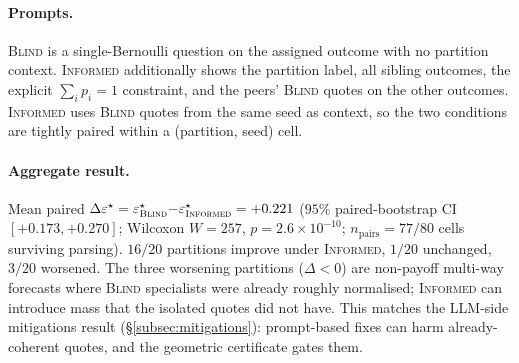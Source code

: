 \documentclass{article}
\theoremstyle{plain}
\theoremstyle{definition}
\theoremstyle{remark}
\newcommand{\eps}{\varepsilon}
\begin{document}
\paragraph{Prompts.}
\textsc{Blind} is a single-Bernoulli question on the assigned
outcome with no partition context.
\textsc{Informed} additionally shows the partition label, all
sibling outcomes, the explicit $\sum_i p_i\!=\!1$ constraint,
and the peers' \textsc{Blind} quotes on the other outcomes.
\textsc{Informed} uses \textsc{Blind} quotes from the same seed
as context, so the two conditions are tightly paired within a
(partition, seed) cell.

\paragraph{Aggregate result.}
Mean paired
$\Delta\eps^\star = \eps^\star_{\textsc{Blind}}{-}\eps^\star_{\textsc{Informed}} = +0.221$
($95\%$ paired-bootstrap CI $[+0.173, +0.270]$; Wilcoxon
$W{=}257$, $p\!=\!2.6\!\times\!10^{-10}$; $n_{\text{pairs}}\!=\!77/80$
cells surviving parsing). $16/20$ partitions improve under
\textsc{Informed}, $1/20$ unchanged, $3/20$ worsened. The three
worsening partitions ($\Delta\!<\!0$) are non-payoff multi-way
forecasts where \textsc{Blind} specialists were already roughly
normalised; \textsc{Informed} can introduce mass that the
isolated quotes did not have. This matches the LLM-side
mitigations result (\S\ref{subsec:mitigations}): prompt-based
fixes can harm already-coherent quotes, and the geometric
certificate gates them.
\end{document}
